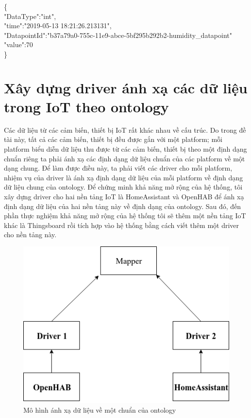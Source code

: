 \{\\
\blank{1cm}"DataType":"int",\\
\blank{1cm}"time":"2019-05-13 18:21:26.213131",\\
\blank{1cm}"DatapointId":"b37a79a0-755c-11e9-abce-5bf295b292b2-humidity\_datapoint"\\
\blank{1cm}"value":70\\
\}


\section{Xây dựng driver ánh xạ các dữ liệu trong IoT theo ontology}
Các dữ liệu từ các cảm biến, thiết bị IoT rất khác nhau về cấu trúc. Do trong đề tài này, tất cả các cảm biến, thiết bị đều được gắn với một platform; mỗi platform biểu diễn dữ liệu thu được từ các cảm biến, thiết bị theo một định dạng chuẩn riêng ta phải ánh xạ các định dạng dữ liệu chuẩn của các platform về một dạng chung. Để làm được điều này, ta phải viết các driver cho mỗi platform, nhiệm vụ của driver là ánh xạ định dạng dữ liệu của mỗi platform về định dạng dữ liệu chung của ontology. Để chứng minh khả năng mở rộng của hệ thống, tôi xây dựng driver cho hai nền tảng IoT là HomeAssistant và OpenHAB để ánh xạ định dạng dữ liệu của hai nền tảng này về định dạng của ontology. Sau đó, đến phần thực nghiệm khả năng mở rộng của hệ thống tôi sẽ thêm một nền tảng IoT khác là Thingsboard rồi tích hợp vào hệ thống bằng cách viết thêm một driver cho nền tảng này.\\
\begin{figure}[h!]
	\center
	\includegraphics[scale=0.6]{image/mapping_service}
	\caption{Mô hình ánh xạ dữ liệu về một chuẩn của ontology}
\end{figure}


